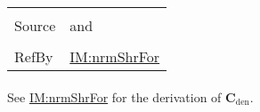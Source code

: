\documentclass[12pt]{article}
\begin{document}
\begin{minipage}{\textwidth}
\begin{tabular}{>{\raggedright}p{}>{\raggedright\arraybackslash}p{}}
\\ \midrule \\
Source & \cite{chen2005} and \cite{karchewski2012}
         
\\ \midrule \\
RefBy & \hyperref[IM:nrmShrFor]{IM:nrmShrFor}
        
\\ \bottomrule
\end{tabular}
\end{minipage}
\paragraph{}
\label{IM:nrmShrForDenDeriv}
See \hyperref[IM:nrmShrFor]{IM:nrmShrFor} for the derivation of ${\symbf{C}_{\text{den}}}$.
\end{document}
